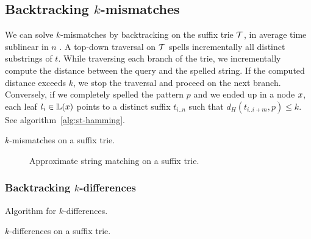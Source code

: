\subsection{Backtracking $k$-mismatches}

We can solve $k$-mismatches by backtracking \citep{Ukkonen1993, Baeza1999} on the suffix trie $\mathcal {T}$, in average time sublinear in $n$ \citep{Navarro2000}.
A top-down traversal on $\mathcal {T}$ spells incrementally all distinct substrings of $t$.
While traversing each branch of the trie, we incrementally compute the distance between the query and the spelled string.
If the computed distance exceeds $k$, we stop the traversal and proceed on the next branch.
Conversely, if we completely spelled the pattern $p$ and we ended up in a node $x$, each leaf $l_i \in \mathbb {L}(x)$ points to a distinct suffix $t_{i..n}$ such that $d_H(t_{i..i+m}, p) \leq k$.
See algorithm~\ref{alg:st-hamming}.

\begin{algorithm}[h]
\caption{$k$-mismatches on a suffix trie.}
\label{alg:st-hamming}
\begin{algorithmic}[1]
			\State \Report {}
			\Repeat
				\State {}
				\State {}
				\State {}
			\Until {}
		\EndIf
	\EndIf
\EndProcedure
\end{algorithmic}
\end{algorithm}

\begin{figure}[h]
\begin{center}
\caption{Approximate string matching on a suffix trie.}
\label{fig:st-hamming}

\end{center}
\end{figure}


\subsubsection{Backtracking $k$-differences}

Algorithm for $k$-differences.

\begin{algorithm}[h]
\caption{$k$-differences on a suffix trie.}
\label{alg:st-edit}
\begin{algorithmic}[1]
		\State \Report {}
			\Repeat
				\State {}
		\EndIf
	\EndIf
\EndProcedure
\end{algorithmic}
\end{algorithm}

